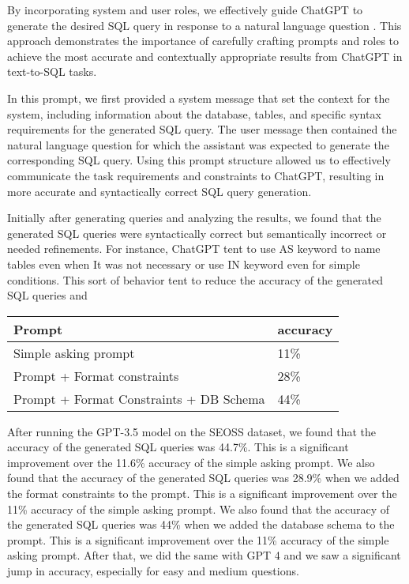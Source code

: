 By incorporating system and user roles, we effectively guide ChatGPT to generate the desired SQL query in response to a natural language question \cite{white2023prompt}. This approach demonstrates the importance of carefully crafting prompts and roles to achieve the most accurate and contextually appropriate results from ChatGPT in text-to-SQL tasks.

In this prompt, we first provided a system message that set the context for the system, including information about the database, tables, and specific syntax requirements for the generated SQL query. The user message then contained the natural language question for which the assistant was expected to generate the corresponding SQL query.
Using this prompt structure allowed us to effectively communicate the task requirements and constraints to ChatGPT, resulting in more accurate and syntactically correct SQL query generation.

Initially after generating queries and analyzing the results, we found that the generated SQL queries were syntactically correct but semantically incorrect or needed refinements. For instance, ChatGPT tent to use AS keyword to name tables even when It was not necessary or use IN keyword even for simple conditions. This sort of behavior tent to reduce the accuracy of the generated SQL queries and

\begin{table}[h]
    \centering
    \begin{tabular}{|l|l|}
        \hline
        \textbf{Prompt}         & \textbf{accuracy} \\ \hline
        Simple asking prompt    & 11\%              \\ \hline
        Prompt + Format constraints & 28\%              \\ \hline
        Prompt + Format Constraints + DB Schema         & 44\%              \\ \hline
    \end{tabular}
\end{table}

After running the GPT-3.5 model on the SEOSS dataset, we found that the accuracy of the generated SQL queries was 44.7\%. This is a significant improvement over the 11.6\% accuracy of the simple asking prompt. We also found that the accuracy of the generated SQL queries was 28.9\% when we added the format constraints to the prompt. This is a significant improvement over the 11\% accuracy of the simple asking prompt. We also found that the accuracy of the generated SQL queries was 44\% when we added the database schema to the prompt. This is a significant improvement over the 11\% accuracy of the simple asking prompt. After that, we did the same with GPT 4 and we saw a significant jump in accuracy, especially for easy and medium questions.


